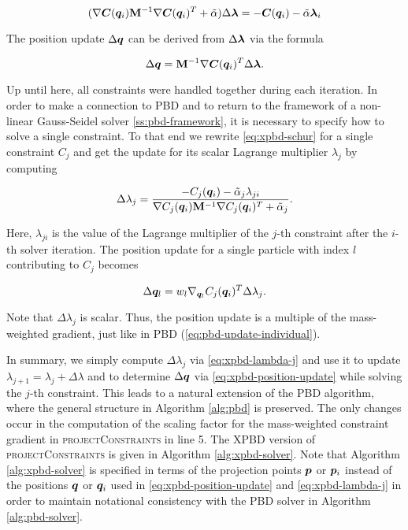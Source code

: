 \begin{equation}\label{eq:xpbd-schur}
    (\nabla \bm{C}(\bm{q}_i) \mathbf{M}^{-1} \nabla \bm{C}(\bm{q}_i)^T + \tilde{\mathbf{\alpha}}) \Delta \bm{\lambda} = -\bm{C}(\bm{q}_i) - 
    \tilde{\mathbf{\alpha}}\bm{\lambda}_i
\end{equation}

\noindent The position update $\Delta \bm{q}$ can be derived from $\Delta \bm{\lambda}$ via the formula

\begin{equation}\label{eq:xpbd-position-update}
    \Delta \bm{q} = \mathbf{M}^{-1} \nabla \bm{C}(\bm{q}_i)^T \Delta \bm{\lambda}.
\end{equation}

Up until here, all constraints were handled together during each iteration. In order to make a connection to PBD and to return to the framework of a
non-linear Gauss-Seidel solver \cref{ss:pbd-framework}, it is necessary to specify how to solve a single constraint. To that end we rewrite 
\autoref{eq:xpbd-schur} for a single constraint $C_j$ and get the update for its scalar Lagrange multiplier $\lambda_j$ by computing

\begin{equation}\label{eq:xpbd-lambda-j}
    \Delta \lambda_j = \frac{-C_j(\bm{q}_i) - \tilde{\alpha}_j \lambda_{ji}}{\nabla C_j(\bm{q}_i) \mathbf{M}^{-1} \nabla C_j(\bm{q}_i)^T + \tilde{\alpha}_j}.
\end{equation}

\noindent Here, $\lambda_{ji}$ is the value of the Lagrange multiplier of the $j$-th constraint after the $i$-th solver iteration. The position update for 
a single particle with index $l$ contributing to $C_j$ becomes

\begin{equation}\label{eq:xpbd-position-update-i}
    \Delta \bm{q}_l = w_l \nabla_{\bm{q}_l} C_j(\bm{q}_i)^T \Delta \lambda_j.
\end{equation}

\noindent Note that $\Delta \lambda_j$ is scalar. Thus, the position update is a multiple of the mass-weighted gradient, just like in PBD 
(\cref{eq:pbd-update-individual}).

In summary, we simply compute $\Delta \lambda_j$ via \autoref{eq:xpbd-lambda-j} and use it to 
update $\lambda_{j+1} = \lambda_j + \Delta \lambda$ and to determine $\Delta \bm{q}$ via \autoref{eq:xpbd-position-update} while solving the $j$-th constraint. 
This leads to a natural extension of the PBD algorithm, where the general structure in Algorithm \ref{alg:pbd} is preserved. The only changes occur in the 
computation of the scaling factor for the 
mass-weighted constraint gradient in \textsc{projectConstraints} in line 5. The XPBD version of \textsc{projectConstraints} is given in 
Algorithm \ref{alg:xpbd-solver}. Note that Algorithm \ref{alg:xpbd-solver} is specified in terms of the projection points $\bm{p}$ or $\bm{p}_i$ instead of the 
positions $\bm{q}$ or $\bm{q}_i$ used in \autoref{eq:xpbd-position-update} and \autoref{eq:xpbd-lambda-j} in order to maintain notational consistency with the
PBD solver in Algorithm \ref{alg:pbd-solver}.

